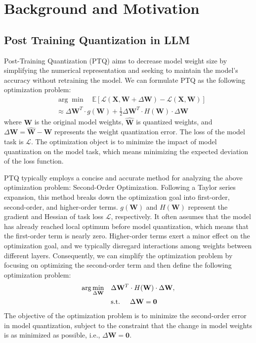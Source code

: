 \section{Background and Motivation}
\subsection{Post Training Quantization in LLM}
Post-Training Quantization (PTQ) \citep{OBD, OBS, obs2order, gptq, woodfisher} aims to decrease model weight size by simplifying the numerical representation and seeking to maintain the model's accuracy without retraining the model.
We can formulate PTQ as the following optimization problem:
\begin{equation*}
\begin{aligned}
    & \arg\min \quad \mathbb{E} [ \mathcal{L}(\mathbf{X}, \mathbf{W} + \Delta \mathbf{W}) - \mathcal{L}(\mathbf{X}, \mathbf{W})] \\
    & \approx \Delta \mathbf{W}^T \cdot g{(\mathbf{W})} + \frac{1}{2}\Delta \mathbf{W}^T \cdot H{(\mathbf{W})} \cdot \Delta \mathbf{W}
\end{aligned}
\label{eq:exp_optimization}
\end{equation*}
where $\mathbf{W}$ is the original model weights, $\mathbf{\hat{W}}$ is quantized weights, and $\Delta \mathbf{W} = \mathbf{\hat{W}} - \mathbf{W}$ represents the weight quantization error. 
The loss of the model task is $\mathcal{L}$.
The optimization object is to minimize the impact of model quantization on the model task, which means minimizing the expected deviation of the loss function.

PTQ typically employs a concise and accurate method for analyzing the above optimization problem: Second-Order Optimization. Following a Taylor series expansion, this method breaks down the optimization goal into first-order, second-order, and higher-order terms.
$g(\mathbf{W})$ and $H(\mathbf{W})$ represent the gradient and Hessian of task loss $\mathcal{L}$, respectively.
It often assumes that the model has already reached local optimum before model quantization, which means that the first-order term is nearly zero. 
Higher-order terms exert a minor effect on the optimization goal, and we typically disregard interactions among weights between different layers. 
Consequently, we can simplify the optimization problem by focusing on optimizing the second-order term and then define the following optimization problem:
\begin{equation}
\begin{aligned}
    \arg \min_{\Delta \mathbf{W} } \quad & \Delta \mathbf{W}^T \cdot H(\mathbf{W}) \cdot \Delta \mathbf{W}, \\ 
    & \text{s.t. \quad} \Delta \mathbf{W} = \mathbf{0}
\end{aligned} \label{eq:optimization_problem}
\end{equation}
The objective of the optimization problem is to minimize the second-order error in model quantization, subject to the constraint that the change in model weights is as minimized as possible, i.e., $\Delta \mathbf{W} = \mathbf{0}$.







